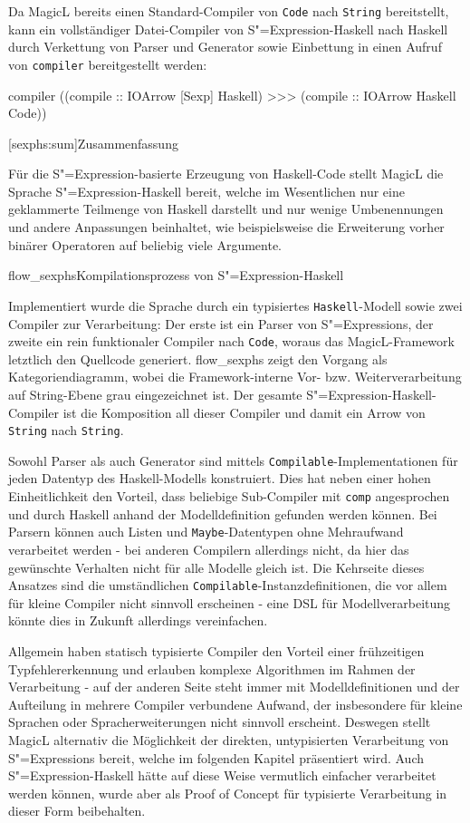\documentclass[11pt, a4paper, bibgerm]{scrbook}
\newcommand\icode[1]{\lstinline?#1?}
\newcommand\lsection{}
\newcommand\abb{}
\newcommand\fig{}
\newcommand{\sexp}{S"=Expression}
\newcommand{\sexps}{S"=Expressions}
\begin{document}
Da MagicL bereits einen Standard-Compiler von \icode{Code} nach
\icode{String} bereitstellt, kann ein vollständiger Datei-Compiler von
\sexp{}-Haskell nach Haskell durch Verkettung von Parser
und Generator sowie Einbettung in einen Aufruf von \icode{compiler}
bereitgestellt werden:
\begin{code}
compiler ((compile :: IOArrow [Sexp] Haskell) >>> 
          (compile :: IOArrow Haskell Code))  
\end{code}

\lsection[sexphs:sum]{Zusammenfassung}

Für die \sexp{}-basierte Erzeugung von Haskell-Code stellt MagicL die
Sprache \sexp{}-Haskell bereit, welche im Wesentlichen nur eine
geklammerte Teilmenge von Haskell darstellt und nur wenige
Umbenennungen und andere Anpassungen beinhaltet, wie beispielsweise
die Erweiterung vorher binärer Operatoren auf beliebig viele
Argumente.

\fig{flow_sexphs}{Kompilationsprozess von \sexp{}-Haskell}

Implementiert wurde die Sprache durch ein typisiertes
\icode{Haskell}-Modell sowie zwei Compiler zur Verarbeitung: Der erste
ist ein Parser von \sexps{}, der zweite ein rein funktionaler Compiler
nach \icode{Code}, woraus das MagicL-Framework letztlich den Quellcode
generiert. \abb{flow_sexphs} zeigt den Vorgang als Kategoriendiagramm,
wobei die Framework-interne Vor- bzw. Weiterverarbeitung auf
String-Ebene grau eingezeichnet ist. Der gesamte
\sexp{}-Haskell-Compiler ist die Komposition all dieser Compiler und
damit ein Arrow von \icode{String} nach \icode{String}.

Sowohl Parser als auch Generator sind mittels
\icode{Compilable}-Implementationen für jeden Datentyp des
Haskell-Modells konstruiert. Dies hat neben einer hohen Einheitlichkeit
den Vorteil, dass beliebige Sub-Compiler mit \icode{comp} angesprochen
und durch Haskell anhand der Modelldefinition gefunden werden
können. Bei Parsern können auch Listen und \icode{Maybe}-Datentypen ohne
Mehraufwand verarbeitet werden - bei anderen Compilern allerdings nicht,
da hier das gewünschte Verhalten nicht für alle Modelle gleich ist. Die
Kehrseite dieses Ansatzes sind die umständlichen
\icode{Compilable}-Instanzdefinitionen, die vor allem für kleine
Compiler nicht sinnvoll erscheinen - eine DSL für Modellverarbeitung
könnte dies in Zukunft allerdings vereinfachen.

Allgemein haben statisch typisierte Compiler den Vorteil einer
frühzeitigen Typfehlererkennung und erlauben komplexe Algorithmen im
Rahmen der Verarbeitung - auf der anderen Seite steht immer mit
Modelldefinitionen und der Aufteilung in mehrere Compiler verbundene
Aufwand, der insbesondere für kleine Sprachen oder Spracherweiterungen
nicht sinnvoll erscheint. Deswegen stellt MagicL alternativ die
Möglichkeit der direkten, untypisierten Verarbeitung von \sexps{}
bereit, welche im folgenden Kapitel präsentiert wird. Auch
\sexp{}-Haskell hätte auf diese Weise vermutlich einfacher verarbeitet
werden können, wurde aber als Proof of Concept für typisierte
Verarbeitung in dieser Form beibehalten.
\end{document}
